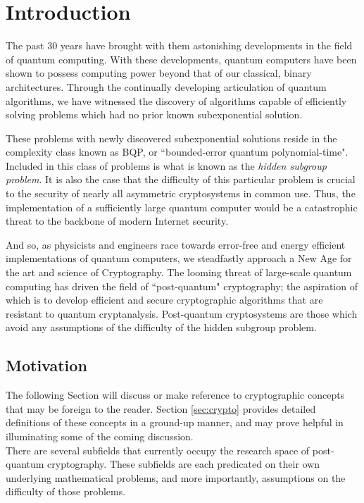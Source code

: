 \chapter{Introduction}

The past 30 years have brought with them astonishing developments in the field of quantum computing. With these developments, quantum computers have been shown to possess computing power beyond that of our classical, binary architectures. Through the continually developing articulation of quantum algorithms, we have witnessed the discovery of algorithms capable of efficiently solving problems which had no prior known subexponential solution. 

These problems with newly discovered subexponential solutions reside in the complexity class known as BQP, or ``bounded-error quantum polynomial-time". Included in this class of problems is what is known as the \textit{hidden subgroup problem}. It is also the case that the difficulty of this particular problem is crucial to the security of nearly all asymmetric cryptosystems in common use. Thus, the implementation of a sufficiently large quantum computer would be a catastrophic threat to the backbone of modern Internet security.  

And so, as physicists and engineers race towards error-free and energy efficient implementations of quantum computers, we steadfastly approach a New Age for the art and science of Cryptography. The looming threat of large-scale quantum computing has driven the field of ``post-quantum" cryptography; the aspiration of which is to develop efficient and secure cryptographic algorithms that are resistant to quantum cryptanalysis. Post-quantum cryptosystems are those which avoid any assumptions of the difficulty of the hidden subgroup problem.\\

\section{Motivation}
\label{sec:motivation}

The following Section will discuss or make reference to cryptographic concepts that may be foreign to the reader. Section  \ref{sec:crypto} provides detailed definitions of these concepts in a ground-up manner, and may prove helpful in illuminating some of the coming discussion.\\

There are several subfields that currently occupy the research space of post-quantum cryptography. These subfields are each predicated on their own underlying mathematical problems, and more importantly, assumptions on the difficulty of those problems.

